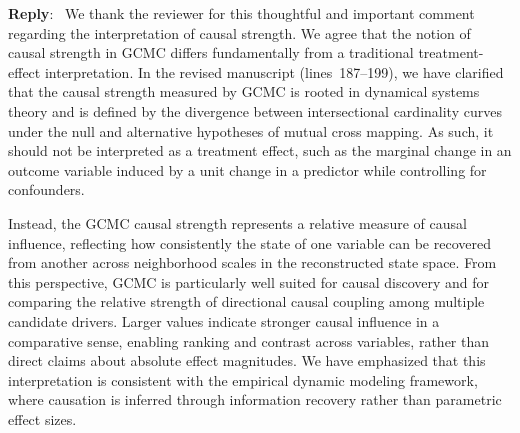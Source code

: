 \documentclass[11pt]{article}
\newcounter{reviewer}
\newenvironment{reply}
   {\medskip \noindent \color{blue} \begin{sf}\textbf{Reply}:\  }
   {\medskip \par \end{sf}}
\begin{document}
\begin{reply}
We thank the reviewer for this thoughtful and important comment regarding the interpretation of causal strength. We agree that the notion of causal strength in GCMC differs fundamentally from a traditional treatment-effect interpretation. In the revised manuscript (lines~187--199), we have clarified that the causal strength measured by GCMC is rooted in dynamical systems theory and is defined by the divergence between intersectional cardinality curves under the null and alternative hypotheses of mutual cross mapping. As such, it should not be interpreted as a treatment effect, such as the marginal change in an outcome variable induced by a unit change in a predictor while controlling for confounders.

Instead, the GCMC causal strength represents a relative measure of causal influence, reflecting how consistently the state of one variable can be recovered from another across neighborhood scales in the reconstructed state space. From this perspective, GCMC is particularly well suited for causal discovery and for comparing the relative strength of directional causal coupling among multiple candidate drivers. Larger values indicate stronger causal influence in a comparative sense, enabling ranking and contrast across variables, rather than direct claims about absolute effect magnitudes. We have emphasized that this interpretation is consistent with the empirical dynamic modeling framework, where causation is inferred through information recovery rather than parametric effect sizes.
\end{reply}

\baselineskip12pt
 
 
\end{document}
